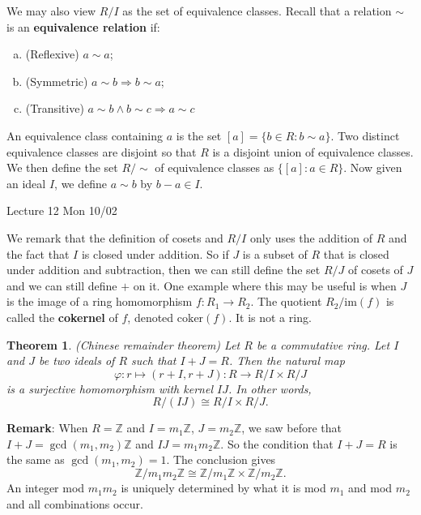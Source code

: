\documentclass{article}
\def\Z{{\mathbb Z}}
\def\Z{{\mathbb Z}}
\newtheorem{theorem}[subsection]{Theorem}
\newcommand{\add}[1]{{\color{blue} #1}}
\begin{document}
\vspace{5pt}
We may also view $R/I$ as the set of equivalence classes. Recall that a relation $\sim$ is an \textbf{equivalence relation} if:
\begin{enumerate}[(a)]
    \item (Reflexive) $a\sim a$;
    \item (Symmetric) $a\sim b\Rightarrow b\sim a$;
    \item (Transitive) $a\sim b \wedge b\sim c\Rightarrow a\sim c$
\end{enumerate}
An equivalence class containing $a$ is the set $[a] = \{b\in R\colon b\sim a\}.$ Two distinct equivalence classes are disjoint so that $R$ is a disjoint union of equivalence classes. We then define the set $R/\!\!\sim$ of equivalence classes as $\{[a]\colon a\in R\}.$ Now given an ideal $I$, we define $a\sim b$ by $b - a \in I$.

\begin{center}
    \add{Lecture 12 Mon 10/02}
\end{center}

We remark that the definition of cosets and $R/I$ only uses the addition of $R$ and the fact that $I$ is closed under addition. So if $J$ is a subset of $R$ that is closed under addition and subtraction, then we can still define the set $R/J$ of cosets of $J$ and we can still define $+$ on it. One example where this may be useful is when $J$ is the image of a ring homomorphism $f:R_1\rightarrow R_2$. The quotient $R_2/\text{im}(f)$ is called the \textbf{cokernel} of $f$, denoted $\text{coker}(f)$. It is not a ring.

\begin{theorem}
    (Chinese remainder theorem) Let $R$ be a commutative ring. Let $I$ and $J$ be two ideals of $R$ such that $I + J = R$. Then the natural map $$\varphi:r\mapsto (r+I, r+J) \colon R\rightarrow R/I \times R/J$$
    is a surjective homomorphism with kernel $IJ$. In other words,
    $$R/(IJ)\cong R/I\times R/J.$$
\end{theorem}

\noindent\textbf{Remark}: When $R = \Z$ and $I = m_1\Z$, $J = m_2\Z$, we saw before that $I + J = \gcd(m_1,m_2)\Z$ and $IJ = m_1m_2\Z$. So the condition that $I+J = R$ is the same as $\gcd(m_1,m_2) = 1$. The conclusion gives
$$\Z/m_1m_2\Z \cong \Z/m_1\Z \times \Z/m_2\Z.$$
An integer mod $m_1m_2$ is uniquely determined by what it is mod $m_1$ and mod $m_2$ and all combinations occur.
\end{document}
